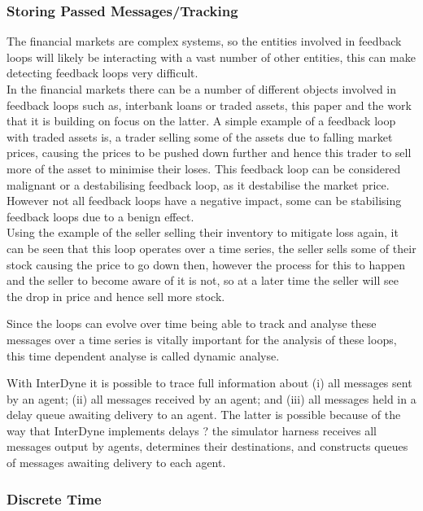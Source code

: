 \documentclass{article}
\begin{document}
\subsubsection{Storing Passed Messages/Tracking}

 The financial markets are complex systems, so the entities involved in feedback loops will likely be interacting with a vast number of other entities, this can make detecting feedback loops very difficult.\\ %
In the financial markets there can be a number of different objects involved in feedback loops such as, interbank loans or traded assets, this paper and the work that it is building on focus on the latter. A simple example of a feedback loop with traded assets is, a trader selling some of the assets due to falling market prices, causing the prices to be pushed down further and hence this trader to sell more of the asset to minimise their loses. This feedback loop can be considered malignant or a destabilising feedback loop, as it destabilise the market price. However not all feedback loops have a negative impact, some can be stabilising feedback loops due to a benign effect.\\      


Using the example of the seller selling their inventory to mitigate loss again, it can be seen that this loop operates over a time series, the seller sells some of their stock causing the price to go down then, however the process for this to happen and the seller to become aware of it is not, so at a later time the seller will see the drop in price and hence sell more stock.


Since the loops can evolve over time being able to track and analyse these messages over a time series is vitally important for the analysis of these loops, this time dependent analyse is called dynamic analyse.  


With InterDyne it is possible to trace full information about (i) all messages sent by an agent; (ii) all messages received by an agent; and (iii) all messages held in a delay queue awaiting delivery to an agent.  The latter is possible because of the way that InterDyne implements delays ? the simulator harness receives all messages output by agents, determines their destinations, and constructs queues of messages awaiting delivery to each agent.  

\subsubsection{Discrete Time}
\end{document}
